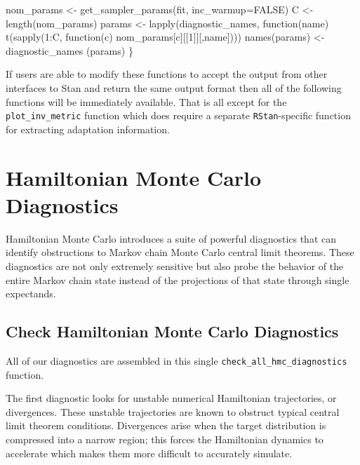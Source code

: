 \documentclass[
  letterpaper,
  DIV=11,
  numbers=noendperiod]{scrartcl}
\newenvironment{Shaded}{\begin{snugshade}}{\end{snugshade}}
\newcommand{\AttributeTok}[1]{\textcolor[rgb]{0.40,0.45,0.13}{#1}}
\newcommand{\ConstantTok}[1]{\textcolor[rgb]{0.56,0.35,0.01}{#1}}
\newcommand{\ControlFlowTok}[1]{\textcolor[rgb]{0.00,0.23,0.31}{#1}}
\newcommand{\DecValTok}[1]{\textcolor[rgb]{0.68,0.00,0.00}{#1}}
\newcommand{\FunctionTok}[1]{\textcolor[rgb]{0.28,0.35,0.67}{#1}}
\newcommand{\NormalTok}[1]{\textcolor[rgb]{0.00,0.23,0.31}{#1}}
\newcommand{\OtherTok}[1]{\textcolor[rgb]{0.00,0.23,0.31}{#1}}
\newcommand{\SpecialCharTok}[1]{\textcolor[rgb]{0.37,0.37,0.37}{#1}}
\begin{document}
\begin{Shaded}
\begin{Highlighting}[]
\NormalTok{  nom\_params }\OtherTok{\textless{}{-}} \FunctionTok{get\_sampler\_params}\NormalTok{(fit, }\AttributeTok{inc\_warmup=}\ConstantTok{FALSE}\NormalTok{)}
\NormalTok{  C }\OtherTok{\textless{}{-}} \FunctionTok{length}\NormalTok{(nom\_params)}
\NormalTok{  params }\OtherTok{\textless{}{-}} \FunctionTok{lapply}\NormalTok{(diagnostic\_names, }
                   \ControlFlowTok{function}\NormalTok{(name) }\FunctionTok{t}\NormalTok{(}\FunctionTok{sapply}\NormalTok{(}\DecValTok{1}\SpecialCharTok{:}\NormalTok{C, }\ControlFlowTok{function}\NormalTok{(c) }
\NormalTok{                                  nom\_params[c][[}\DecValTok{1}\NormalTok{]][,name])))}
  \FunctionTok{names}\NormalTok{(params) }\OtherTok{\textless{}{-}}\NormalTok{ diagnostic\_names}
\NormalTok{  (params)}
\NormalTok{\}}
\end{Highlighting}
\end{Shaded}

If users are able to modify these functions to accept the output from
other interfaces to Stan and return the same output format then all of
the following functions will be immediately available. That is all
except for the \texttt{plot\_inv\_metric} function which does require a
separate \texttt{RStan}-specific function for extracting adaptation
information.

\hypertarget{hamiltonian-monte-carlo-diagnostics}{%
\section{Hamiltonian Monte Carlo
Diagnostics}\label{hamiltonian-monte-carlo-diagnostics}}

Hamiltonian Monte Carlo introduces a suite of powerful diagnostics that
can identify obstructions to Markov chain Monte Carlo central limit
theorems. These diagnostics are not only extremely sensitive but also
probe the behavior of the entire Markov chain state instead of the
projections of that state through single expectands.

\hypertarget{check-hamiltonian-monte-carlo-diagnostics}{%
\subsection{Check Hamiltonian Monte Carlo
Diagnostics}\label{check-hamiltonian-monte-carlo-diagnostics}}

All of our diagnostics are assembled in this single
\texttt{check\_all\_hmc\_diagnostics} function.

The first diagnostic looks for unstable numerical Hamiltonian
trajectories, or divergences. These unstable trajectories are known to
obstruct typical central limit theorem conditions. Divergences arise
when the target distribution is compressed into a narrow region; this
forces the Hamiltonian dynamics to accelerate which makes them more
difficult to accurately simulate.
\end{document}
